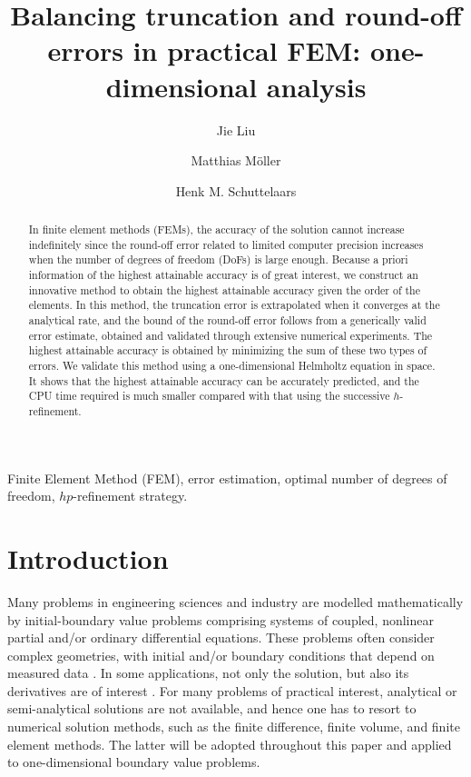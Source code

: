 \documentclass[review,3p]{elsarticle}
\begin{document}
\begin{frontmatter}

\title{Balancing truncation and round-off errors in practical FEM: one-dimensional analysis}

 \author[1]{Jie Liu}
 \author[1]{Matthias M\"oller}
 \author[1]{Henk M. Schuttelaars}
 
 \address[1]{Delft Institute of Applied Mathematics\\ Delft University of Technology\\ Van Mourik Broekmanweg 6, 2628 XE Delft, The Netherlands}

\begin{abstract}
In finite element methods (FEMs), the accuracy of the solution cannot increase indefinitely since the round-off error related to limited computer precision increases when the number of degrees of freedom (DoFs) is large enough. Because a priori information of the highest attainable accuracy is of great interest, we construct an innovative method to obtain the highest attainable accuracy given the order of the elements.
In this method, the truncation error is extrapolated when it converges at the analytical rate, and the bound of the round-off error follows from a generically valid error estimate, obtained and validated through extensive numerical experiments. The highest attainable accuracy is obtained by minimizing the sum of these two types of errors.
We validate this method using a one-dimensional Helmholtz equation in space. 
It shows that the highest attainable accuracy can be accurately predicted, and the CPU time required is much smaller compared with that using the successive $h$-refinement. 
\end{abstract}

\begin{keyword}
Finite Element Method (FEM), error estimation, optimal number of degrees of freedom, $hp$-refinement strategy.
\end{keyword}

\end{frontmatter}

\section{Introduction}

Many problems in engineering sciences and industry are modelled mathematically by initial-boundary value problems comprising systems of coupled, nonlinear partial and/or ordinary differential equations. These problems often consider complex geometries, with initial and/or boundary conditions that depend on measured data \cite{Kumar2016}. 
In some applications, not only the solution, but also its derivatives are of interest \cite{Kumar2016,carey1982derivative}.
For many problems of practical interest, analytical or semi-analytical solutions are not available, and hence one has to resort to numerical solution methods, such as the finite difference, finite volume, and finite element methods. The latter will be adopted throughout this paper and applied to one-dimensional boundary value problems.
\end{document}

